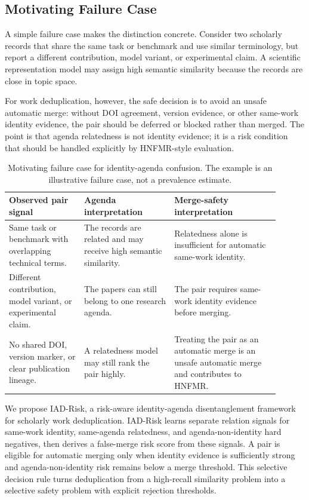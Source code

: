 \documentclass[11pt]{article}
\begin{document}
\subsection{Motivating Failure Case}

A simple failure case makes the distinction concrete. Consider two scholarly records that share the same task or benchmark and use similar terminology, but report a different contribution, model variant, or experimental claim. A scientific representation model may assign high semantic similarity because the records are close in topic space.

For work deduplication, however, the safe decision is to avoid an unsafe automatic merge: without DOI agreement, version evidence, or other same-work identity evidence, the pair should be deferred or blocked rather than merged. The point is that agenda relatedness is not identity evidence; it is a risk condition that should be handled explicitly by HNFMR-style evaluation.

\begin{table}[H]
\caption{Motivating failure case for identity-agenda confusion. The example is an illustrative failure case, not a prevalence estimate.}
\label{tab:motivating-failure-case}
\centering
\footnotesize
\setlength{\tabcolsep}{3pt}
\begin{tabular}{L{0.25\linewidth}L{0.30\linewidth}L{0.35\linewidth}}
\toprule
Observed pair signal & Agenda interpretation & Merge-safety interpretation \\
\midrule
Same task or benchmark with overlapping technical terms. & The records are related and may receive high semantic similarity. & Relatedness alone is insufficient for automatic same-work identity. \\
Different contribution, model variant, or experimental claim. & The papers can still belong to one research agenda. & The pair requires same-work identity evidence before merging. \\
No shared DOI, version marker, or clear publication lineage. & A relatedness model may still rank the pair highly. & Treating the pair as an automatic merge is an unsafe automatic merge and contributes to HNFMR. \\
\bottomrule
\end{tabular}
\end{table}

We propose IAD-Risk, a risk-aware identity-agenda disentanglement framework for scholarly work deduplication. IAD-Risk learns separate relation signals for same-work identity, same-agenda relatedness, and agenda-non-identity hard negatives, then derives a false-merge risk score from these signals. A pair is eligible for automatic merging only when identity evidence is sufficiently strong and agenda-non-identity risk remains below a merge threshold. This selective decision rule turns deduplication from a high-recall similarity problem into a selective safety problem with explicit rejection thresholds.
\end{document}
